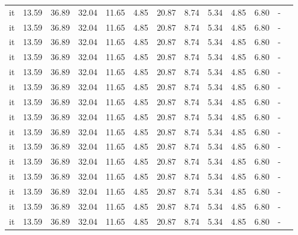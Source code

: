 \begin{table}[H]
\begin{tabularx}{\textwidth}{Xcccccccccccc}
            it & 13.59 & 36.89 & 32.04 & 11.65 & 4.85 & 20.87 & 8.74 & 5.34 & 4.85 & 6.80 & - \\
            it & 13.59 & 36.89 & 32.04 & 11.65 & 4.85 & 20.87 & 8.74 & 5.34 & 4.85 & 6.80 & - \\
            it & 13.59 & 36.89 & 32.04 & 11.65 & 4.85 & 20.87 & 8.74 & 5.34 & 4.85 & 6.80 & - \\
            it & 13.59 & 36.89 & 32.04 & 11.65 & 4.85 & 20.87 & 8.74 & 5.34 & 4.85 & 6.80 & - \\
            it & 13.59 & 36.89 & 32.04 & 11.65 & 4.85 & 20.87 & 8.74 & 5.34 & 4.85 & 6.80 & - \\
            it & 13.59 & 36.89 & 32.04 & 11.65 & 4.85 & 20.87 & 8.74 & 5.34 & 4.85 & 6.80 & - \\
            it & 13.59 & 36.89 & 32.04 & 11.65 & 4.85 & 20.87 & 8.74 & 5.34 & 4.85 & 6.80 & - \\
            it & 13.59 & 36.89 & 32.04 & 11.65 & 4.85 & 20.87 & 8.74 & 5.34 & 4.85 & 6.80 & - \\
            it & 13.59 & 36.89 & 32.04 & 11.65 & 4.85 & 20.87 & 8.74 & 5.34 & 4.85 & 6.80 & - \\
            it & 13.59 & 36.89 & 32.04 & 11.65 & 4.85 & 20.87 & 8.74 & 5.34 & 4.85 & 6.80 & - \\
            it & 13.59 & 36.89 & 32.04 & 11.65 & 4.85 & 20.87 & 8.74 & 5.34 & 4.85 & 6.80 & - \\
            it & 13.59 & 36.89 & 32.04 & 11.65 & 4.85 & 20.87 & 8.74 & 5.34 & 4.85 & 6.80 & - \\
            it & 13.59 & 36.89 & 32.04 & 11.65 & 4.85 & 20.87 & 8.74 & 5.34 & 4.85 & 6.80 & - \\
            it & 13.59 & 36.89 & 32.04 & 11.65 & 4.85 & 20.87 & 8.74 & 5.34 & 4.85 & 6.80 & - \\
            it & 13.59 & 36.89 & 32.04 & 11.65 & 4.85 & 20.87 & 8.74 & 5.34 & 4.85 & 6.80 & - \\
        \bottomrule
    \end{tabularx}
\end{table}
    